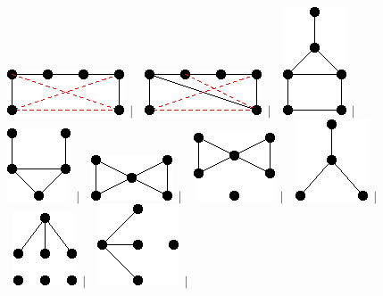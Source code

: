 \documentclass[11pt,paper=b5,footinclude,headinclude]{scrbook} %
\newtheorem{ex}{Vaja\hypertarget{sol:\theex}}[chapter]
\begin{document}
\begin{ex}
\begin{figure}
\includegraphics[scale=0.5]{smallGraphs/g_XZ13.png}$\,\mid\,$\
\includegraphics[scale=0.5]{smallGraphs/g_XZ14.png}$\,\mid\,$\
\includegraphics[scale=0.5]{smallGraphs/g_antenna.png}$\,\mid\,$\
\includegraphics[scale=0.5]{smallGraphs/g_bull.png}$\,\mid\,$\
\includegraphics[scale=0.5]{smallGraphs/g_butterfly.png}$\,\mid\,$\
\includegraphics[scale=0.5]{smallGraphs/g_butterflyUK1.png}$\,\mid\,$\
\includegraphics[scale=0.5]{smallGraphs/g_claw.png}$\,\mid\,$\
\includegraphics[scale=0.5]{smallGraphs/g_clawU3K1.png}$\,\mid\,$\
\includegraphics[scale=0.5]{smallGraphs/g_clawUK1.png}$\,\mid\,$\

\end{figure}
\end{ex}
\end{document}
